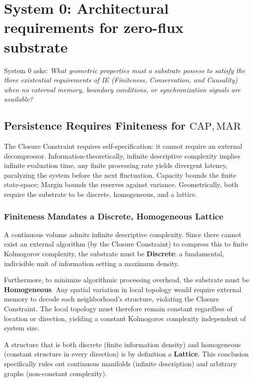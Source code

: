\section{System 0: Architectural requirements for zero-flux substrate}
\label{sec:System0_vacuum_requirements}

System 0 asks: \emph{What geometric properties must a substrate possess to satisfy the three existential requirements of IE (Finiteness, Conservation, and Causality) when no external memory, boundary conditions, or synchronization signals are available?}

\subsection{Persistence Requires Finiteness for \texorpdfstring{$\mathrm{CAP}, \mathrm{MAR}$}{CAP, MAR}}
\label{sec:finiteness}
The Closure Constraint requires self-specification: it cannot require an external decompressor. Information-theoretically, infinite descriptive complexity implies infinite evaluation time, any finite processing rate yields divergent latency, paralyzing the system before the next fluctuation. Capacity bounds the finite state-space; Margin bounds the reserves against variance. Geometrically, both require the substrate to be discrete, homogeneous, and a lattice.

\subsubsection{Finiteness Mandates a Discrete, Homogeneous Lattice}
\label{subsubsec:discrete_homogeneous_lattice}

A continuous volume admits infinite descriptive complexity. Since there cannot exist an external algorithm (by the Closure Constraint) to compress this to finite Kolmogorov complexity, the substrate must be \textbf{Discrete}: a fundamental, indivisible unit of information setting a maximum density.

Furthermore, to minimize algorithmic processing overhead, the substrate must be \textbf{Homogeneous}. Any spatial variation in local topology would require external memory to decode each neighborhood's structure, violating the Closure Constraint. The local topology must therefore remain constant regardless of location or direction, yielding a constant Kolmogorov complexity independent of system size.

A structure that is both discrete (finite information density) and homogeneous (constant structure in every direction) is by definition a \textbf{Lattice}. This conclusion specifically rules out continuous manifolds (infinite description) and arbitrary graphs (non-constant complexity).

